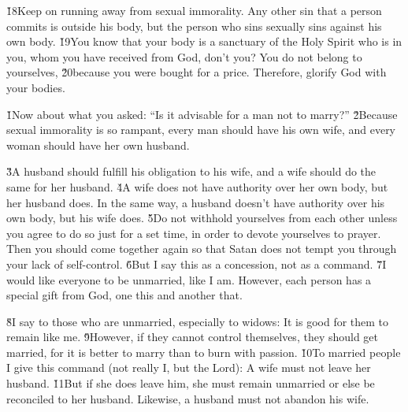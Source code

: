 \v{18}Keep on running away from sexual immorality. Any other sin that a person commits is outside his body, but the person who sins sexually sins against his own body. \v{19}You know that your body is a sanctuary of the Holy Spirit who is in you, whom you have received from God, don't you? You do not belong to yourselves, \v{20}because you were bought for a price. Therefore, glorify God with your bodies.

\v{1}Now about what you asked: ``Is it advisable for a man not to marry?'' \v{2}Because sexual immorality is so rampant, every man should have his own wife, and every woman should have her own husband.

\v{3}A husband should fulfill his obligation to his wife, and a wife should do the same for her husband. \v{4}A wife does not have authority over her own body, but her husband does. In the same way, a husband doesn't have authority over his own body, but his wife does. \v{5}Do not withhold yourselves from each other unless you agree to do so just for a set time, in order to devote yourselves to prayer. Then you should come together again so that Satan does not tempt you through your lack of self-control. \v{6}But I say this as a concession, not as a command. \v{7}I would like everyone to be unmarried, like I am. However, each person has a special gift from God, one this and another that.

\v{8}I say to those who are unmarried, especially to widows: It is good for them to remain like me. \v{9}However, if they cannot control themselves, they should get married, for it is better to marry than to burn with passion. \v{10}To married people I give this command (not really I, but the Lord): A wife must not leave her husband. \v{11}But if she does leave him, she must remain unmarried or else be reconciled to her husband. Likewise, a husband must not abandon his wife.

